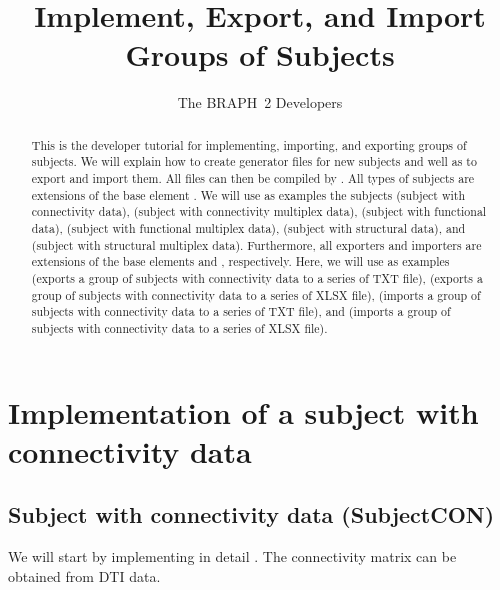 \documentclass{tufte-handout}
\title{Implement, Export, and Import Groups of Subjects}
\author[The BRAPH~2 Developers]{The BRAPH~2 Developers}
\begin{document}
\maketitle

\begin{abstract}
This is the developer tutorial for implementing, importing, and exporting groups of subjects.
We will explain how to create generator files  for new subjects and well as to export and import them. All  files can then be compiled by . 
All types of subjects are extensions of the base element . 
We will use as examples the subjects  (subject with connectivity data),  (subject with connectivity multiplex data),  (subject with functional data),  (subject with functional multiplex data),  (subject with structural data), and  (subject with structural multiplex data). 
Furthermore, all exporters and importers are extensions of the base elements  and , respectively. Here, we will use as examples  (exports a group of subjects with connectivity data to a series of TXT file),  (exports a group of subjects with connectivity data to a series of XLSX file),  (imports a group of subjects with connectivity data to a series of TXT file), and  (imports a group of subjects with connectivity data to a series of XLSX file).

\end{abstract}

\tableofcontents

\clearpage

\section{Implementation of a subject with connectivity data}

\subsection{Subject with connectivity data (SubjectCON)}

We will start by implementing in detail . The connectivity matrix can be obtained from DTI data.
\end{document}
